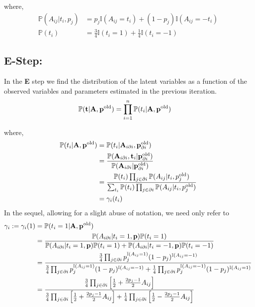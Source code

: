 \documentclass[12pt,onecolumn,letterpaper]{article}
\begin{document}
\noindent
where,
\begin{align*}
\mathbb{P}(A_{ij}|t_i,p_j) &= p_j\mathbb{I}(A_{ij}=t_i)+(1-p_j)\mathbb{I}(A_{ij}=-t_i) \\
\mathbb{P}(t_i) &= 
\frac{3}{4}\mathbb{I}(t_i=1)+\frac{1}{4}\mathbb{I}(t_i=-1)
\end{align*}

\subsection*{E-Step:}
In the \textbf{E} step we find the distribution of the latent variables as a function of the observed variables and parameters estimated in the previous iteration.
\begin{align*}
\mathbb{P}(\textbf{t}|\textbf{A},\textbf{p}^{{\rm old}}) &= 
\prod_{i=1}^{n} \mathbb{P}(t_i|\textbf{A},\textbf{p}^{{\rm old}})
\end{align*}

\noindent
where,
\begin{align*}
\mathbb{P}(t_i|\textbf{A},\textbf{p}^{{\rm old}}) &=
\mathbb{P}(t_i|\textbf{A}_{i\partial i},\textbf{p}_{\partial i}^{{\rm old}}) \\
&= 
\frac{
\mathbb{P}(\textbf{A}_{i\partial i},\textbf{t}_i|\textbf{p}_{\partial i}^{{\rm old}})
} 	
{
\mathbb{P}(\textbf{A}_{i\partial i}|\textbf{p}_{\partial i}^{{\rm old}})
} \\
&=
\frac{
\mathbb{P}(t_i)\prod_{j\in \partial i} \mathbb{P}(A_{ij}|t_i,p_j^{{\rm old}})
}
{
\sum_{t_i} \mathbb{P}(t_i)\prod_{j\in \partial i} \mathbb{P}(A_{ij}|t_i,p_j^{{\rm old}})
} \\
&= \gamma_i(t_i)
\end{align*}
In the sequel, allowing for a slight abuse of notation, we need only refer to
\begin{align*}
  \gamma_i:=\gamma_i(1)&=\mathbb{P}(t_i=1|\textbf{A},\textbf{p}^{{\rm old}})\\
  &=\frac{\mathbb{P}(A_{i\partial i}|t_i=1,{\bf p})\mathbb{P}(t_i=1)}{\mathbb{P}(A_{i\partial i}|t_i=1,{\bf p})\mathbb{P}(t_i=1)+\mathbb{P}(A_{i\partial i}|t_i=-1,{\bf p})\mathbb{P}(t_i=-1)}\\
  &=\frac{\frac{3}{4}\prod_{j\in\partial i} p_j^{\mathbb{I}(A_{ij}=1)}(1-p_j)^{\mathbb{I}(A_{ij}=-1)}}{\frac{3}{4}\prod_{j\in\partial i} p_j^{\mathbb{I}(A_{ij}=1)}(1-p_j)^{\mathbb{I}(A_{ij}=-1)}+\frac{1}{4}\prod_{j\in\partial i} p_j^{\mathbb{I}(A_{ij}=-1)}(1-p_j)^{\mathbb{I}(A_{ij}=1)}}\\
  &=\frac{\frac{3}{4}\prod_{j\in\partial i} \left[\frac{1}{2}+\frac{2p_j-1}{2}A_{ij}\right]}{\frac{3}{4}\prod_{j\in\partial i} \left[\frac{1}{2}+\frac{2p_j-1}{2}A_{ij}\right]+\frac{1}{4}\prod_{j\in\partial i} \left[\frac{1}{2}-\frac{2p_j-1}{2}A_{ij}\right]}
\end{align*}
\end{document}
